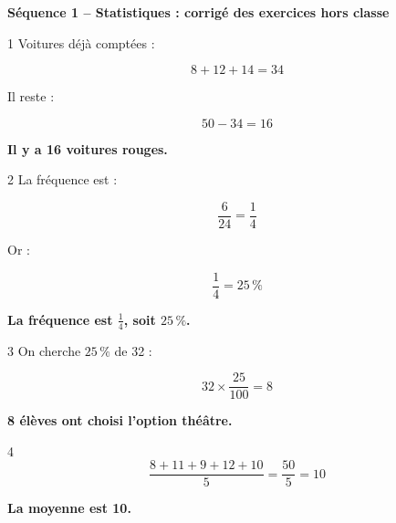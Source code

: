 \documentclass[9.5pt,a4paper,landscape]{article}
\newcommand{\rep}[1]{%
  {\color{corrige}\bfseries #1}%
}
\begin{document}
\fontsize{9}{10.5}\selectfont

\begin{center}
{\large\bfseries\color{bleu}
Séquence 1 -- Statistiques : corrigé des exercices hors classe}\par
\end{center}

\vspace{0.25em}


\noindent
\begin{minipage}[t]{0.242\linewidth}
\begin{exo}{1}
Voitures déjà comptées :

\[
8+12+14=34
\]

Il reste :

\[
50-34=16
\]

\rep{Il y a 16 voitures rouges.}
\end{exo}
\end{minipage}
\hfill
%
\begin{minipage}[t]{0.242\linewidth}
\begin{exo}{2}
La fréquence est :

\[
\frac{6}{24}
=
\frac14
\]

Or :

\[
\frac14=25\,\%
\]

\rep{La fréquence est \(\frac14\), soit \(25\,\%\).}
\end{exo}
\end{minipage}
\hfill
%
\begin{minipage}[t]{0.242\linewidth}
\begin{exo}{3}
On cherche \(25\,\%\) de 32 :

\[
32\times\frac{25}{100}=8
\]

\rep{8 élèves ont choisi l'option théâtre.}
\end{exo}
\end{minipage}
\hfill
%
\begin{minipage}[t]{0.242\linewidth}
\begin{exo}{4}
\[
\frac{8+11+9+12+10}{5}
=
\frac{50}{5}
=
10
\]

\rep{La moyenne est 10.}
\end{exo}
\end{minipage}

\vspace{0.16cm}

\end{document}
